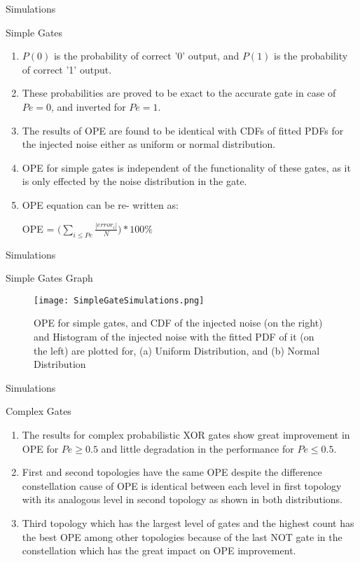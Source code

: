 \documentclass{beamer}
\begin{document}
\begin{frame}{Simulations}
    \begin{block}{Simple Gates}
    \begin{enumerate}
        \item $P(0)$ is the probability of correct '0' output, and $P(1)$ is the probability of correct ’1’ output.
        \item These probabilities are proved to be exact to the accurate gate in case of $Pe = 0$, and inverted for $Pe = 1$.
        \item The results of OPE are found to be identical with CDFs of fitted PDFs for the injected noise either as uniform or normal distribution.
        \item OPE for simple gates is independent of the functionality of these gates, as it is only effected by the noise distribution in the gate. 
        \item OPE equation can be re- written as:\\
        \begin{center}
            OPE = $\bigg(\displaystyle \sum_{i\leq Pe}^{} \frac{|error_i|}{N}\bigg) * 100\%$
        \end{center}
    \end{enumerate}
    \end{block}
\end{frame}

\begin{frame}{Simulations}
\begin{block}{Simple Gates Graph}
\begin{figure}
    \centering
    \texttt{[image: SimpleGateSimulations.png]}
    \caption{OPE for simple gates, and CDF of the injected noise (on the right) and Histogram of the injected noise with the fitted PDF of it (on the left) are plotted for, (a) Uniform Distribution, and (b) Normal Distribution}
    \label{fig:my_label}
\end{figure}
\end{block}
\end{frame}

\begin{frame}{Simulations}
    \begin{block}{Complex Gates}
    \begin{enumerate}
        \item The results for complex probabilistic XOR gates show great improvement in OPE for $Pe \geq 0.5$ and little degradation in the performance for $Pe \leq 0.5$.
        \item First and second topologies have the same OPE despite the difference constellation cause of OPE is identical between each level in first topology with its analogous level in second topology as shown in both distributions.
        \item Third topology which has the largest level of gates and the highest count has the best OPE among other topologies because of the last NOT gate in the constellation which has the great impact on OPE improvement.
    \end{enumerate}
    \end{block}
\end{frame}
\end{document}
